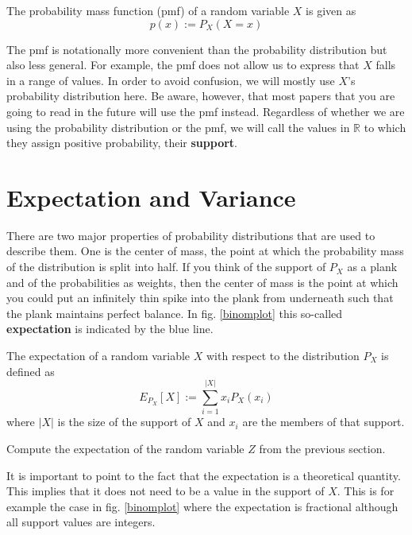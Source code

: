 \documentclass[a4paper,11pt,leqno]{report}
\begin{document}
\begin{Definition}
The probability mass function (pmf) of a random variable $ X $ is given as
$$ p(x) := P_{X}(X = x) $$
\end{Definition}

The pmf is notationally more convenient than the probability distribution but also less general. For example, the pmf does not
allow us to express that $ X $ falls in a range of values. In order to avoid confusion, we will mostly use $ X $'s 
probability distribution here. Be aware, however, that most papers that you are going to read in the future will use the pmf
instead. Regardless of whether we are using the probability distribution or the pmf, we will call the values in $ \mathbb{R} $
to which they assign positive probability, their \textbf{support}.



\section{Expectation and Variance}

There are two major properties of probability distributions that are used to describe them. One is the center of mass, the point
at which the probability mass of the distribution is split into half. If you think of the support of $ P_{X} $ as a plank and 
of the probabilities as weights, then the center of mass is the point at which you could put an infinitely thin spike into the
plank from underneath such that the plank maintains perfect balance. In fig. \ref{binomplot} this so-called \textbf{expectation}
is indicated by the blue line.

\begin{Definition}
The expectation of a random variable $ X $ with respect to the distribution $ P_{X} $ is defined as
$$ E_{P_{X}}[X] := \underset{i = 1}{\overset{|X|}{\sum}} x_{i}P_{X}(x_{i}) $$
where $ |X| $ is the size of the support of $ X $ and $ x_{i} $ are the members of that support.
\end{Definition}

\begin{Exercise}
Compute the expectation of the random variable $ Z $ from the previous section.
\end{Exercise}

It is important to point to the fact that the expectation is a theoretical quantity. This implies that
it does not need to be a value in the support of $ X $. This is for example the case in fig. \ref{binomplot} where the
expectation is fractional although all support values are integers.
\end{document}
